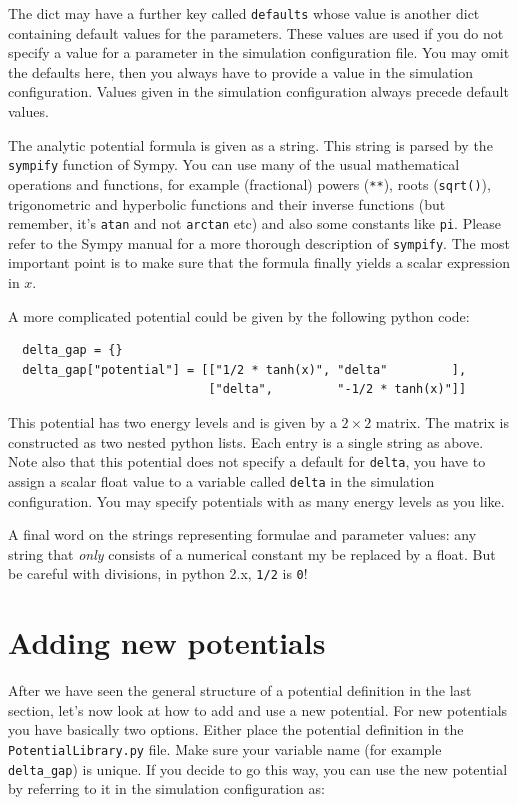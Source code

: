\documentclass[a4paper,10pt]{report}
\begin{document}
The dict may have a further key called \texttt{defaults} whose value is
another dict containing default values for the parameters. These values
are used if you do not specify a value for a parameter in the simulation
configuration file. You may omit the defaults here, then you always have
to provide a value in the simulation configuration. Values given in the
simulation configuration always precede default values.

The analytic potential formula is given as a string. This string is parsed
by the \texttt{sympify} function of Sympy. You can use many of the usual
mathematical operations and functions, for example (fractional) powers
(\texttt{**}), roots (\texttt{sqrt()}), trigonometric and hyperbolic functions
and their inverse functions (but remember, it's \texttt{atan} and not \texttt{arctan} etc)
and also some constants like \texttt{pi}. Please refer to the Sympy manual
for a more thorough description of \texttt{sympify}. The most important point is
to make sure that the formula finally yields a scalar expression in $x$.

\newpage
A more complicated potential could be given by the following python code:

\begin{verbatim}
  delta_gap = {}
  delta_gap["potential"] = [["1/2 * tanh(x)", "delta"         ],
                            ["delta",         "-1/2 * tanh(x)"]]
\end{verbatim}

This potential has two energy levels and is given by a $2 \times 2$ matrix.
The matrix is constructed as two nested python lists. Each entry is a single
string as above. Note also that this potential does not specify a default
for \texttt{delta}, you have to assign a scalar float value to a variable
called \texttt{delta} in the simulation configuration. You may specify potentials
with as many energy levels as you like.

A final word on the strings representing formulae and parameter values: any string
that \emph{only} consists of a numerical constant my be replaced by a float. But
be careful with divisions, in python 2.x, \texttt{1/2} is \texttt{0}!

\section{Adding new potentials}

After we have seen the general structure of a potential definition in the last
section, let's now look at how to add and use a new potential. For new potentials
you have basically two options. Either place the potential definition in the
\texttt{PotentialLibrary.py} file. Make sure your variable name (for example
\texttt{delta\_gap}) is unique. If you decide to go this way, you can use
the new potential by referring to it in the simulation configuration as:
\end{document}
